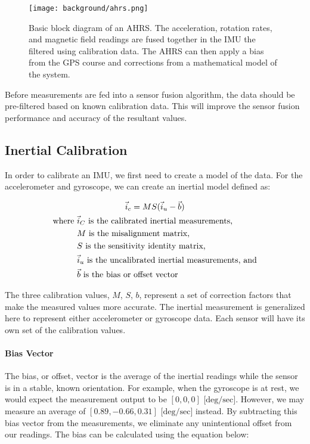 \begin{figure}[h!]
    \caption[AHRS block diagram]{Basic block diagram of an AHRS. 
    The acceleration, rotation rates, and magnetic field readings are fused together in the IMU the filtered using calibration data. 
    The AHRS can then apply a bias from the GPS course and corrections from a mathematical model of the system.}
    \label{fig:ahrs_design}
    \centering
    \texttt{[image: background/ahrs.png]}
\end{figure}

Before measurements are fed into a sensor fusion algorithm, the data should be pre-filtered based on known calibration data.
This will improve the sensor fusion performance and accuracy of the resultant values.

\subsection{Inertial Calibration}

In order to calibrate an IMU, we first need to create a model of the data. For the accelerometer and gyroscope, we can create an inertial model defined as:

\begin{gather}
    \vec{i}_c=MS(\vec{i}_u-\vec{b}) \\
    \begin{aligned}
        \text{where } & \vec{i}_C \text{ is the calibrated inertial measurements,} \\ 
        & M \text{ is the misalignment matrix,} \\
        & S \text{ is the sensitivity identity matrix,} \\
        & \vec{i}_u \text{ is the uncalibrated inertial measurements, and} \\
        & \vec{b} \text{ is the bias or offset vector}
    \end{aligned} \notag
\end{gather}

The three calibration values, $M$, $S$, $b$, represent a set of correction factors that make the measured values more accurate. The inertial measurement is generalized here to represent either accelerometer or gyroscope data. Each sensor will have its own set of the calibration values.

\paragraph*{Bias Vector} The bias, or offset, vector is the average of the inertial readings while the sensor is in a stable, known orientation. For example, when the gyroscope is at rest, we would expect the measurement output to be $[0,0,0] \text{ [deg/sec]}$. However, we may measure an average of $[0.89, -0.66, 0.31] \text{ [deg/sec]}$ instead. By subtracting this bias vector from the measurements, we eliminate any unintentional offset from our readings. The bias can be calculated using the equation below:

